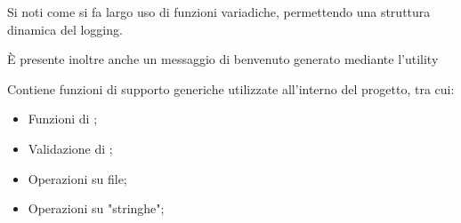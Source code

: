   Si noti come si fa largo uso di funzioni variadiche, permettendo una struttura dinamica del logging.

  È presente inoltre anche un messaggio di benvenuto generato mediante l'utility 

  \begin{center}  \end{center}
  Contiene funzioni di supporto generiche utilizzate all'interno del progetto, tra cui:

  \begin{itemize}
    \item Funzioni di \href{https://it.wikipedia.org/wiki/Sequenziamento}{};
    \item Validazione di ;
    \item Operazioni su file;
    \item Operazioni su "stringhe";
  \end{itemize}
  \newpage

